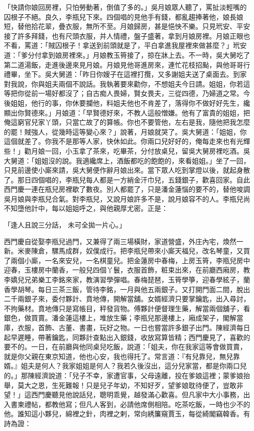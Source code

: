 \begin{showcontents}{}
「快請你娘回房裡，只怕勞動著，倒值了多的。」吳月娘眾人聽了，罵扯淡輕嘴的囚根子不絕。良久，李瓶兒下來。四個唱的見他手有錢，都亂趨捧著他，娘長娘短，替他拾花翠，疊衣服，無所不至。月娘歸房，甚是悒怏不樂。只見玳安、平安接了許多拜錢，也有尺頭衣服，并人情禮，盤子盛著，拿到月娘房裡。月娘正眼也不看，罵道：「賊囚根子！拿送到前頭就是了，平白拿進我屋裡來做甚麼？」玳安道：「爹分付拿到娘房裡來。」月娘教玉筲接了，掠在牀上去。不一時，吳大舅吃了第二道湯飯，走進後邊來見月娘。月娘見他哥進房來，連忙花枝招颭，與他哥哥行禮畢，坐下。吳大舅道：「昨日你嫂子在這裡打攬，又多謝姐夫送了桌面去。到家對我說，你與姐夫兩個不說話。我執著要來勸你，不想姐夫今日請。姐姐，你若這等把你從前一場好都沒了；自古痴人畏婦，賢女畏夫，三從四德，乃婦道之常。今後姐姐，他行的事，你休要攔他，料姐夫他也不肯差了，落得你不做好好先生，纔顯出你賢德來。」月娘道：「早賢德好來，不教人這般憎嫌。他有了富貴的姐姐，把俺這窮官兒家丫頭，只當亡故了的算帳。你也不要管他，左右是我，隨他把我怎麼的罷！賊強人，從幾時這等變心來？」說著，月娘就哭了。吳大舅道：「姐姐，你這個就差了。你我不是那等人家，快休如此。你兩口兒好好的，俺每走來也有光輝些！」勸月娘一回，小玉拿了茶來，吃畢茶，分付放桌兒，留吳大舅房裡吃酒。吳大舅道：「姐姐沒的說。我適纔席上，酒飯都吃的飽飽的，來看姐姐。」坐了一回，只見前邊使小廝來請，吳大舅便作辭月娘出來。當下眾人吃到掌燈以後，就起身散了。那日四個唱的，李瓶兒每人都是一方綃金汗巾兒，五錢銀子，歡喜回家。自此西門慶一連在瓶兒房裡歇了數夜。別人都罷了，只是潘金蓮惱的要不的，替他唆調吳月娘與李瓶兒合氣。對李瓶兒，又說月娘許多不是，說月娘容不的人。李瓶兒尚不知墮他計中，每以姐姐呼之，與他親厚尤密。正是：

「逢人且說三分話，  未可全拋一片心。」

西門慶自從娶李瓶兒過門，又兼得了兩三場橫財，家道營盛，外庄內宅，煥然一新。米麥陳倉，騾馬成群，奴僕成行。把李瓶兒帶來小廝天福兒，改名琴童，又買了兩個小廝，一名來安兒，一名棋童兒。把金蓮房中春梅，上房玉筲，李瓶兒房中迎春，玉樓房中蘭香，一般兒四個丫鬟，衣服首飾，粧束出來，在前廳西廂房，教李嬌兒兄弟樂工李銘來家，教演習學彈唱。春梅琵琶，玉筲學箏，迎春學絃子，蘭香學胡琴。每日三茶三飯，管待李銘，一月與他五兩銀子。又打開門面二間，脫出二千兩銀子來，委付夥計、賁地傳，開解當舖。女婿經濟只要掌鑰匙，出入尋討，不拘藥材。賁地傳只是寫帳目，秤發貨物。傅夥計便督理生藥，解當兩個舖子，看銀色，做買賣。潘金蓮這樓上，堆放生藥；李瓶兒那邊樓上，廂成架子，閣解當庫，衣服，首飾、古董、書畫，玩好之物。一日也嘗當許多銀子出門。陳經濟每日起早遲睡，帶著鑰匙，同夥計查點出入銀錢，收放寫算皆精；西門慶見了，喜歡的要不的。一日，在前廳與他同桌兒吃飯，說道：「姐夫，你在我家這等會做買賣，就是你父親在東京知道，他也心安，我也得托了。常言道：『有兒靠兒，無兒靠婿。』姐夫是何人？我家姐姐是何人？我若久後沒出，這分兒家當，都是你兩口兒的。」那陳經濟說道：「兒子不幸，家遭官事，父母遠離，投在爹娘這裡；蒙爹娘抬舉，莫大之恩，生死難報！只是兒子年幼，不知好歹，望爹娘耽待便了，豈敢非望！」這西門慶聽見他說話兒，聰明乖覺，越發滿心歡喜。但凡家中大小事務，出入書柬禮帖，都教他寫；但凡人客到，必請他席側相陪。吃茶吃飯，一時也少不的他。誰知這小夥兒，綿裡之針，肉裡之剌，常向綉簾窺賈玉，每從綺閣竊韓香。有詩為證：


\end{showcontents}
